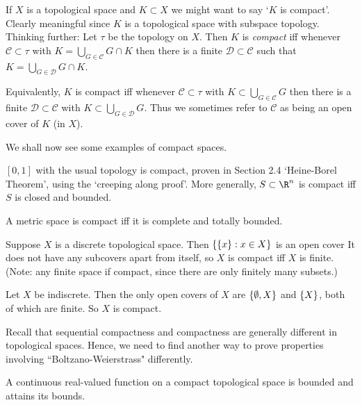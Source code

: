 \begin{remark}
    If $X$ is a topological space and $K\subset X$ we might want to say `$K$ is compact'. Clearly meaningful since $K$ is a topological space with subspace topology. Thinking further: Let $\tau$ be the topology on $X$. Then $K$ is \emph{compact} iff whenever $\mathcal{C}\subset \tau$ with $K = \bigcup_{G\in \mathcal{C}} G\cap K$ then there is a finite $\mathcal{D}\subset \mathcal{C}$ such that $K = \bigcup_{G\in \mathcal{D}} G\cap K$.

    Equivalently, $K$ is compact iff whenever $\mathcal{C}\subset \tau$ with $K\subset \bigcup_{G\in \mathcal{C}} G$ then there is a finite $\mathcal{D}\subset\mathcal{C}$ with $K\subset \bigcup_{G\in \mathcal{D}} G$. Thus we sometimes refer to $\mathcal{C}$ as being an open cover of $K$ (in $X$).
\end{remark}

We shall now see some examples of compact spaces.
\begin{example}
    $[0,1]$ with the usual topology is compact, proven in Section 2.4 `Heine-Borel Theorem', using the `creeping along proof'. More generally, $S\subset \R^n$ is compact iff $S$ is closed and bounded.
\end{example}

\begin{example}
    A metric space is compact iff it is complete and totally bounded.
\end{example}

\begin{example}
    Suppose $X$ is a discrete topological space. Then $\{\{x\} : x\in X\}$ is an open cover It does not have any subcovers apart from itself, so $X$ is compact iff $X$ is finite. (Note: any finite space if compact, since there are only finitely many subsets.)
\end{example}

\begin{example}
    Let $X$ be indiscrete. Then the only open covers of $X$ are $\{\emptyset, X\}$ and $\{X\}$, both of which are finite. So $X$ is compact.
\end{example}

Recall that sequential compactness and compactness are generally different in topological spaces. Hence, we need to find another way to prove properties involving ``Boltzano-Weierstrass" differently.
\begin{theorem} \label{thm:33}
A continuous real-valued function on a compact topological space is bounded and attains its bounds.
\end{theorem}

